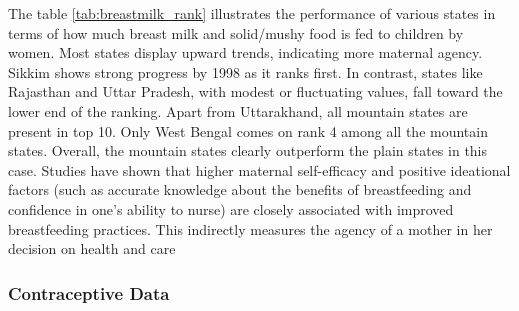 The table \ref{tab:breastmilk_rank} illustrates the performance of various states in terms of how much breast milk and solid/mushy food is fed to children by women. Most states display  upward trends, indicating more maternal agency. Sikkim shows strong progress by 1998 as it ranks first. In contrast, states like Rajasthan and Uttar Pradesh, with modest or fluctuating values, fall toward the lower end of the ranking. Apart from Uttarakhand, all mountain states are present in top 10. Only West Bengal comes on rank 4 among all the mountain states. Overall, the mountain states clearly outperform the plain states in this case. Studies have shown that higher maternal self-efficacy and positive ideational factors (such as accurate knowledge about the benefits of breastfeeding and confidence in one’s ability to nurse) are closely associated with improved breastfeeding practices. This indirectly measures the agency of a mother in her decision on health and care \citep{Hutchinson_2022}
\subsubsection{Contraceptive Data}

